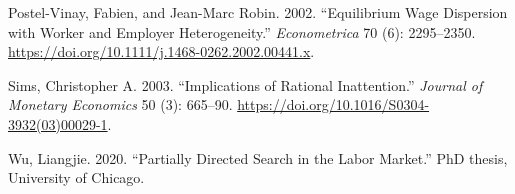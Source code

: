 \documentclass[
  letterpaper,
  DIV=11,
  numbers=noendperiod]{scrreprt}
\newlength{\cslhangindent}
\newlength{\cslentryspacingunit} %
\newenvironment{CSLReferences}[2] %
 {%
  \setlength{\parindent}{0pt}
  \ifodd #1
  \let\oldpar\par
  \def\par{\hangindent=\cslhangindent\oldpar}
  \fi
  \setlength{\parskip}{#2\cslentryspacingunit}
 }%
 {}
\begin{document}
\begin{CSLReferences}{1}{0}
\leavevmode{}%
Postel-Vinay, Fabien, and Jean-Marc Robin. 2002. {``Equilibrium {Wage
Dispersion} with {Worker} and {Employer Heterogeneity}.''}
\emph{Econometrica} 70 (6): 2295--2350.
\url{https://doi.org/10.1111/j.1468-0262.2002.00441.x}.

\leavevmode{}%
Sims, Christopher A. 2003. {``Implications of Rational Inattention.''}
\emph{Journal of Monetary Economics} 50 (3): 665--90.
\url{https://doi.org/10.1016/S0304-3932(03)00029-1}.

\leavevmode{}%
Wu, Liangjie. 2020. {``Partially {Directed Search} in the {Labor
Market}.''} PhD thesis, University of Chicago.

\end{CSLReferences}
\end{document}
